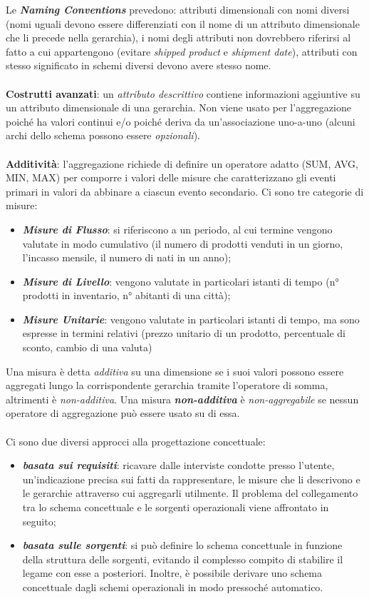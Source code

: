\documentclass[a4paper, notitlepage, 9pt]{extreport}
\begin{document}
\noindent
Le \textit{\textbf{Naming Conventions}} prevedono: attributi dimensionali con nomi diversi (nomi uguali devono essere differenziati con il nome di un attributo dimensionale che li precede nella gerarchia), i nomi degli attributi non dovrebbero riferirsi al fatto a cui appartengono (evitare \textit{shipped product} e \textit{shipment date}), attributi con stesso significato in schemi diversi devono avere stesso nome.
\\\\
\textbf{Costrutti avanzati}: un \textit{attributo descrittivo} contiene informazioni aggiuntive su un attributo dimensionale di una gerarchia. Non viene usato per l’aggregazione poiché ha valori continui e/o poiché deriva da un’associazione uno-a-uno (alcuni archi dello schema possono essere \textit{opzionali}).
\\\\
\textbf{Additività}: l'aggregazione richiede di definire un operatore adatto (SUM, AVG, MIN, MAX) per comporre i valori delle misure che caratterizzano gli eventi primari in valori da abbinare a ciascun evento secondario. Ci sono tre categorie di misure:
\begin{itemize}
	\item \textit{\textbf{Misure di Flusso}}: si riferiscono a un periodo, al cui termine vengono valutate in modo cumulativo (il numero di prodotti venduti in un giorno, l’incasso mensile, il numero di nati in un anno);
	\item \textit{\textbf{Misure di Livello}}: vengono valutate in particolari istanti di tempo (n° prodotti in inventario, n° abitanti di una città);
	\item \textit{\textbf{Misure Unitarie}}: vengono valutate in particolari istanti di tempo, ma sono espresse in termini relativi (prezzo unitario di un prodotto, percentuale di sconto, cambio di una valuta)
\end{itemize}
\noindent
Una misura è detta \textit{additiva} su una dimensione se i suoi valori possono essere aggregati lungo la corrispondente gerarchia tramite l’operatore di somma, altrimenti è \textit{non-additiva}. Una misura \textit{\textbf{non-additiva}} è \textit{non-aggregabile} se nessun operatore di aggregazione può essere usato su di essa.
\\\\
Ci sono due diversi approcci alla progettazione concettuale:
\begin{itemize}
	\item \textit{\textbf{basata sui requisiti}}: ricavare dalle interviste condotte presso l'utente, un'indicazione precisa sui fatti da rappresentare, le misure che li descrivono e le gerarchie attraverso cui aggregarli utilmente. Il problema del collegamento tra lo schema concettuale e le sorgenti operazionali viene affrontato in seguito;
	\item \textit{\textbf{basata sulle sorgenti}}: si può definire lo schema concettuale in funzione della struttura delle sorgenti, evitando il complesso compito di stabilire il legame con esse a posteriori. Inoltre, è possibile derivare uno schema concettuale dagli schemi operazionali in modo pressoché automatico.
\end{itemize}
\end{document}
